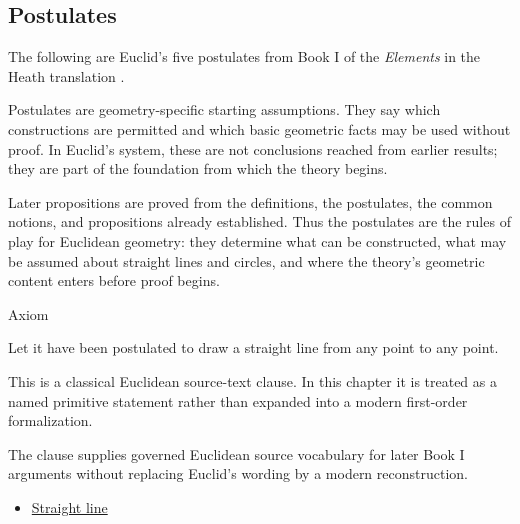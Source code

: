 \subsection*{Postulates}

\begin{remark*}
The following are Euclid's five postulates from Book I of the
\textit{Elements} in the Heath translation
\citep[Book I, Postulates 1--5]{euclid-elements-heath}.
\end{remark*}

\begin{remark*}[Exposition]
Postulates are geometry-specific starting assumptions. They say which
constructions are permitted and which basic geometric facts may be used without
proof. In Euclid's system, these are not conclusions reached from earlier
results; they are part of the foundation from which the theory begins.

Later propositions are proved from the definitions, the postulates, the common
notions, and propositions already established. Thus the postulates are the
rules of play for Euclidean geometry: they determine what can be constructed,
what may be assumed about straight lines and circles, and where the theory's
geometric content enters before proof begins.
\end{remark*}

\begin{axiombox}{Axiom}
\begin{axiom}
\label{ax:euclid-postulate-draw-straight-line}
Let it have been postulated to draw a straight line from any point to any point.
\end{axiom}
\end{axiombox}
\begin{remark*}
This is a classical Euclidean source-text clause. In this chapter it is treated
as a named primitive statement rather than expanded into a modern first-order
formalization.
\end{remark*}

\begin{remark*}[Interpretation]
The clause supplies governed Euclidean source vocabulary for later Book I
arguments without replacing Euclid's wording by a modern reconstruction.
\end{remark*}

\begin{lra-not-visible}
\begin{dependencies}
\begin{itemize}
  \item \hyperref[def:euclid-straight-line]{Straight line}
\end{itemize}
\end{dependencies}
\end{lra-not-visible}

